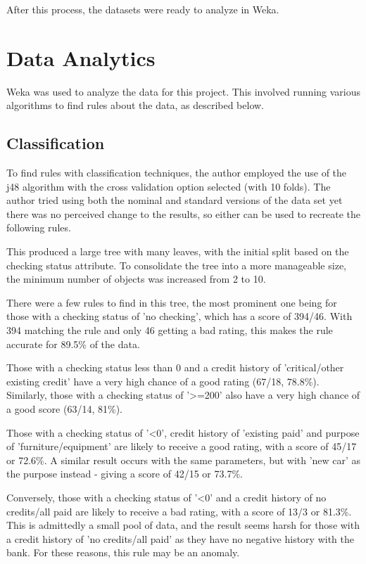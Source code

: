 \documentclass[runningheads, 12pt]{llncs}
\begin{document}
After this process, the datasets were ready to analyze in Weka.

\section{Data Analytics}

Weka was used to analyze the data for this project. This involved running various algorithms to find rules about the data, as described below.

\subsection{Classification}

To find rules with classification techniques, the author employed the use of the j48 algorithm with the cross validation option  selected (with 10 folds). The author tried using both the nominal and standard versions of the data set yet there was no perceived change to the results, so either can be used to recreate the following rules. 

This produced a large tree with many leaves, with the initial split based on the checking status attribute. To consolidate the tree into a more manageable size, the minimum number of objects was increased from 2 to 10. 

There were a few rules to find in this tree, the most prominent one being for those with a checking status of 'no checking', which has a score of 394/46. With 394 matching the rule and only 46 getting a bad rating, this makes the rule accurate for 89.5\% of the data.

Those with a checking status less than 0 and a credit history of 'critical/other existing credit' have a very high chance of a good rating (67/18, 78.8\%). Similarly, those with a checking status of '\textgreater=200' also have a very high chance of a good score (63/14, 81\%).

Those with a checking status of '\textless0', credit history of 'existing paid' and purpose of 'furniture/equipment' are likely to receive a good rating, with a score of 45/17 or 72.6\%. A similar result occurs with the same parameters, but with 'new car' as the purpose instead - giving a score of 42/15 or 73.7\%.

Conversely, those with a checking status of '\textless0' and a credit history of no credits/all paid are likely to receive a bad rating, with a score of 13/3 or 81.3\%. This is admittedly a small pool of data, and the result seems harsh for those with a credit history of 'no credits/all paid' as they have no negative history with the bank. For these reasons, this rule may be an anomaly.
\end{document}
